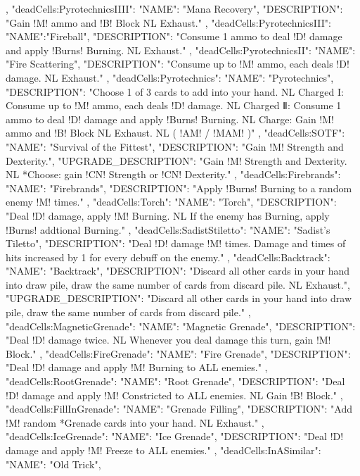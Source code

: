 {{  },
  "deadCells:PyrotechnicsIIII": {
    "NAME": "Mana Recovery",
    "DESCRIPTION": "Gain !M! ammo and !B! Block NL Exhaust."
  },
  "deadCells:PyrotechnicsIII": {
    "NAME":"Fireball",
    "DESCRIPTION": "Consume 1 ammo to deal !D! damage and apply !Burns! Burning. NL Exhaust."
  },
  "deadCells:PyrotechnicsII": {
    "NAME": "Fire Scattering",
    "DESCRIPTION": "Consume up to !M! ammo, each deals !D! damage. NL Exhaust."
  },
  "deadCells:Pyrotechnics": {
    "NAME": "Pyrotechnics",
    "DESCRIPTION": "Choose 1 of 3 cards to add into your hand. NL Charged I: Consume up to !M! ammo, each deals !D! damage. NL Charged Ⅱ: Consume 1 ammo to deal !D! damage and apply !Burns! Burning. NL Charge: Gain !M! ammo and !B! Block NL Exhaust. NL ( !AM! / !MAM! 
)"
  },
  "deadCells:SOTF": {
    "NAME": "Survival of the Fittest",
    "DESCRIPTION": "Gain !M! Strength and Dexterity.",
    "UPGRADE_DESCRIPTION": "Gain !M! Strength and Dexterity. NL *Choose: gain !CN! Strength or !CN! Dexterity."
  },
  "deadCells:Firebrands": {
    "NAME": "Firebrands",
    "DESCRIPTION": "Apply !Burns! Burning to a random enemy !M! times."
  },
  "deadCells:Torch": {
    "NAME": "Torch",
    "DESCRIPTION": "Deal !D! damage, apply !M! Burning. NL If the enemy has Burning, apply !Burns! addtional Burning."
  },
  "deadCells:SadistStiletto": {
    "NAME": "Sadist's Tiletto",
    "DESCRIPTION": "Deal !D! damage !M! times. Damage and times of hits increased by 1 for every debuff on the enemy."
  },
  "deadCells:Backtrack": {
    "NAME": "Backtrack",
    "DESCRIPTION": "Discard all other cards in your hand into draw pile, draw the same number of cards from discard pile. NL Exhaust.",
    "UPGRADE_DESCRIPTION": "Discard all other cards in your hand into draw pile, draw the same number of cards from discard pile."
  },
  "deadCells:MagneticGrenade": {
    "NAME": "Magnetic Grenade",
    "DESCRIPTION": "Deal !D! damage twice. NL Whenever you deal damage this turn, gain !M! Block."
  },
  "deadCells:FireGrenade": {
    "NAME": "Fire Grenade",
    "DESCRIPTION": "Deal !D! damage and apply !M! Burning to ALL enemies."
  },
  "deadCells:RootGrenade": {
    "NAME": "Root Grenade",
    "DESCRIPTION": "Deal !D! damage and apply !M! Constricted to ALL enemies. NL Gain !B! Block."
  },
  "deadCells:FillInGrenade": {
    "NAME": "Grenade Filling",
    "DESCRIPTION": "Add !M! random *Grenade cards into your hand. NL Exhaust."
  },
  "deadCells:IceGrenade": {
    "NAME": "Ice Grenade",
    "DESCRIPTION": "Deal !D! damage and apply !M! Freeze to ALL enemies."
  },
  "deadCells:InASimilar": {
    "NAME": "Old Trick",
}}
